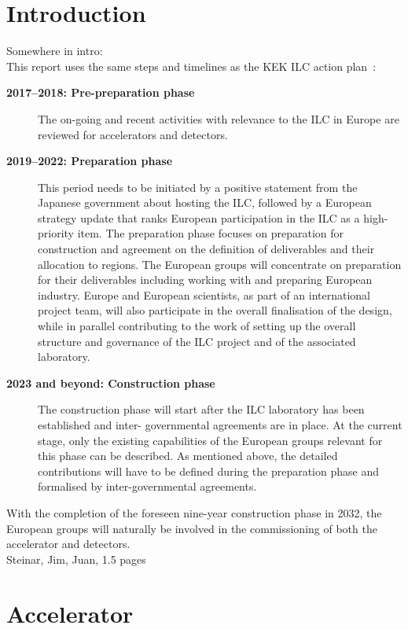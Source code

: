 \documentclass[%
 reprint,
 floatfix,
 amsmath,amssymb,
 aps,
]{revtex4-1}
\begin{document}
\section{\label{sec:intro}Introduction}
Somewhere in intro: \\
This report uses the same steps and timelines as the KEK ILC action plan~\cite{kekactionplan}:
\begin{description}
\item[\bfseries 2017--2018: Pre-preparation phase] 
The on-going and recent activities with relevance to the ILC in Europe are reviewed for accelerators and detectors.
\item[\bfseries 2019--2022: Preparation phase]
This period needs to be initiated by a positive statement from the Japanese government about hosting the ILC, followed by a European strategy update that ranks European participation in the ILC as a high-priority item. The preparation phase focuses on preparation for construction and agreement on the definition of deliverables and their allocation to regions. The European groups will concentrate on preparation for their deliverables including working with and preparing European industry. Europe and European scientists, as part of an international project team, will also participate in the overall finalisation of the design, while in parallel contributing to the work of setting up the overall structure and governance of the ILC project and of the associated laboratory.
\item[\bfseries 2023 and beyond: Construction phase]
The construction phase will start after the ILC laboratory has been established and inter- governmental agreements are in place. At the current stage, only the existing capabilities of the European groups relevant for this phase can be described. As mentioned above, the detailed contributions will have to be defined during the preparation phase and formalised by inter-governmental agreements. 
\end{description}

With the completion of the foreseen nine-year construction phase in 2032, the European groups will naturally be involved in the commissioning of both the accelerator and detectors. \\
Steinar, Jim, Juan, 1.5 pages

\section{\label{sec:acc}Accelerator}
\end{document}
